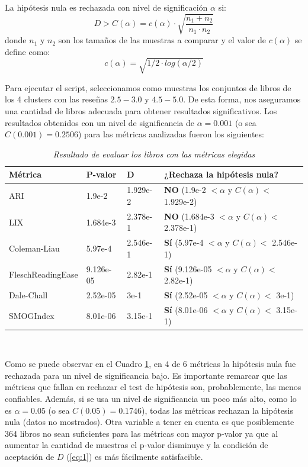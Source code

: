 \documentclass[12pt,journal,compsoc]{IEEEtran}
\begin{document}
La hipótesis nula es rechazada con nivel de significación $\alpha$ si:
\begin{equation} \label{eq:1}
D > C(\alpha) = c(\alpha) \cdot \sqrt{\frac{n_1+n_2}{n_1\cdot n_2}}
\end{equation}
donde $n_1$ y $n_2$ son los tamaños de las muestras a comparar y el valor de $c(\alpha)$ se define como:
$$c(\alpha) = \sqrt{1/2\cdot log(\alpha/2)}$$

Para ejecutar el script, seleccionamos como muestras los conjuntos de libros de los 4 clusters con las reseñas $2.5-3.0$ y $4.5-5.0$. De esta forma, nos aseguramos una cantidad de libros adecuada para obtener resultados significativos. Los resultados obtenidos con un nivel de significancia de $\alpha = 0.001$ (o sea $C(0.001) = 0.2506$) para las métricas analizadas fueron los siguientes:\\

\begin{table}[H]
\begin{center}
  \begin{tabular}{ | l | l | l | l | }
  \hline
  Métrica & P-valor & D & ¿Rechaza la hipótesis nula?\\
  \hline
  ARI & 1.9e-2 & 1.929e-2 & \textbf{NO} (1.9e-2 $< \alpha$ y $C(\alpha) <$ 1.929e-2)\\
  \hline
  LIX & 1.684e-3 & 2.378e-1 & \textbf{NO} (1.684e-3 $< \alpha$ y $C(\alpha) <$ 2.378e-1)\\
  \hline
  Coleman-Liau & 5.97e-4 & 2.546e-1 & \textbf{Sí} (5.97e-4 $< \alpha$ y $C(\alpha) <$ 2.546e-1)\\
  \hline
  FleschReadingEase & 9.126e-05 & 2.82e-1 & \textbf{Sí} (9.126e-05 $< \alpha$ y $C(\alpha) <$ 2.82e-1)\\
  \hline
  Dale-Chall & 2.52e-05 & 3e-1 & \textbf{Sí} (2.52e-05 $< \alpha$ y $C(\alpha) <$ 3e-1)\\
  \hline
  SMOGIndex & 8.01e-06 & 3.15e-1 & \textbf{Sí} (8.01e-06 $< \alpha$ y $C(\alpha) <$ 3.15e-1)\\
  \hline
  \end{tabular}
  \caption{\small \textit{Resultado de evaluar los libros con las métricas elegidas}}
  \label{table:resultadoMetricas}
  \end{center}
  \end{table}


~

Como se puede observar en el Cuadro \ref{table:resultadoMetricas}, en 4 de 6 métricas la hipótesis nula fue rechazada para un nivel de significancia bajo. Es importante remarcar que las métricas que fallan en rechazar el test de hipótesis son, probablemente, las menos confiables. Además, si se usa un nivel de significancia un poco más alto, como lo es $\alpha = 0.05$ (o sea $C(0.05) = 0.1746$), todas las métricas rechazan la hipótesis nula (datos no mostrados). Otra variable a tener en cuenta es que posiblemente 364 libros no sean suficientes para las métricas con mayor p-valor ya que al aumentar la cantidad de muestras el p-valor disminuye y la condición de aceptación de $D$ (\ref{eq:1}) es más fácilmente satisfacible.
\end{document}
